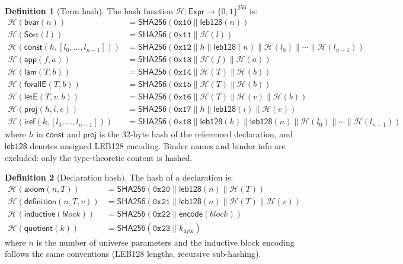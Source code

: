 \documentclass[11pt]{article}
\theoremstyle{definition}
\newtheorem{definition}{Definition}[section]
\theoremstyle{plain}
\theoremstyle{remark}
\newcommand{\hash}{\mathcal{H}}
\newcommand{\SHA}{\textsf{SHA256}}
\newcommand{\Sort}{\textsf{Sort}}
\newcommand{\bvar}{\textsf{bvar}}
\newcommand{\const}{\textsf{const}}
\newcommand{\app}{\textsf{app}}
\newcommand{\lam}{\textsf{lam}}
\newcommand{\forallE}{\textsf{forallE}}
\newcommand{\letE}{\textsf{letE}}
\newcommand{\concat}{\mathbin{\|}}
\begin{document}
\begin{definition}[Term hash]
\label{def:hash}
The hash function $\hash : \textsf{Expr} \to \{0,1\}^{256}$ is:
\begin{align*}
  \hash(\bvar(n)) &= \SHA(\mathtt{0x10} \concat \textsf{leb128}(n)) \\
  \hash(\Sort(l)) &= \SHA(\mathtt{0x11} \concat \hash(l)) \\
  \hash(\const(h, [l_0, \ldots, l_{n-1}])) &= \SHA(\mathtt{0x12} \concat h \concat \textsf{leb128}(n) \concat \hash(l_0) \concat \cdots \concat \hash(l_{n-1})) \\
  \hash(\app(f, a)) &= \SHA(\mathtt{0x13} \concat \hash(f) \concat \hash(a)) \\
  \hash(\lam(T, b)) &= \SHA(\mathtt{0x14} \concat \hash(T) \concat \hash(b)) \\
  \hash(\forallE(T, b)) &= \SHA(\mathtt{0x15} \concat \hash(T) \concat \hash(b)) \\
  \hash(\letE(T, v, b)) &= \SHA(\mathtt{0x16} \concat \hash(T) \concat \hash(v) \concat \hash(b)) \\
  \hash(\textsf{proj}(h, i, e)) &= \SHA(\mathtt{0x17} \concat h \concat \textsf{leb128}(i) \concat \hash(e)) \\
  \hash(\textsf{iref}(k, [l_0, \ldots, l_{n-1}])) &= \SHA(\mathtt{0x18} \concat \textsf{leb128}(k) \concat \textsf{leb128}(n) \concat \hash(l_0) \concat \cdots \concat \hash(l_{n-1}))
\end{align*}
where $h$ in $\const$ and $\textsf{proj}$ is the 32-byte hash of the referenced declaration,
and $\textsf{leb128}$ denotes unsigned LEB128 encoding.
Binder names and binder info are excluded: only the type-theoretic content is hashed.
\end{definition}

\begin{definition}[Declaration hash]
\label{def:hash-decl}
The hash of a declaration is:
\begin{align*}
  \hash(\textsf{axiom}(n, T)) &= \SHA(\mathtt{0x20} \concat \textsf{leb128}(n) \concat \hash(T)) \\
  \hash(\textsf{definition}(n, T, v)) &= \SHA(\mathtt{0x21} \concat \textsf{leb128}(n) \concat \hash(T) \concat \hash(v)) \\
  \hash(\textsf{inductive}(\textit{block})) &= \SHA(\mathtt{0x22} \concat \textsf{encode}(\textit{block})) \\
  \hash(\textsf{quotient}(k)) &= \SHA(\mathtt{0x23} \concat k_{\textsf{byte}})
\end{align*}
where $n$ is the number of universe parameters and the inductive block encoding follows
the same conventions (LEB128 lengths, recursive sub-hashing).
\end{definition}
\end{document}
